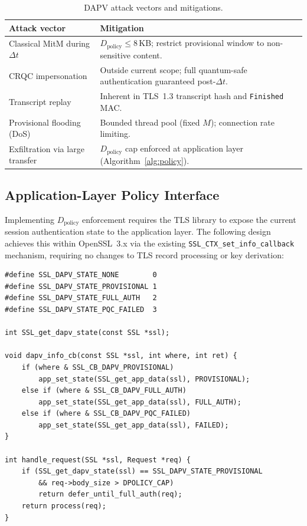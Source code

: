\documentclass[preprint,10pt,3p]{elsarticle}
\newcommand{\Dt}{\ensuremath{\Delta t}}
\begin{document}
\begin{table}[htbp]
\centering
\caption{DAPV attack vectors and mitigations.}
\label{tab:mitigations}
\small
\begin{tabular}{p{3.8cm}p{6.0cm}}
\toprule
\textbf{Attack vector} & \textbf{Mitigation} \\
\midrule
Classical MitM during \Dt
  & $D_\text{policy} \leq 8$\,KB; restrict provisional window to
    non-sensitive content. \\[4pt]
CRQC impersonation
  & Outside current scope; full quantum-safe authentication guaranteed
    post-\Dt. \\[4pt]
Transcript replay
  & Inherent in TLS~1.3 transcript hash and \texttt{Finished} MAC. \\[4pt]
Provisional flooding (DoS)
  & Bounded thread pool (fixed $M$); connection rate limiting. \\[4pt]
Exfiltration via large transfer
  & $D_\text{policy}$ cap enforced at application layer
    (Algorithm~\ref{alg:policy}). \\
\bottomrule
\end{tabular}
\end{table}

\subsection{Application-Layer Policy Interface}

Implementing $D_\text{policy}$ enforcement requires the TLS library to expose
the current session authentication state to the application layer.  The
following design achieves this within OpenSSL~3.x via the existing
\texttt{SSL\_CTX\_set\_info\_callback} mechanism, requiring no changes to TLS
record processing or key derivation:

\begin{verbatim}
#define SSL_DAPV_STATE_NONE        0
#define SSL_DAPV_STATE_PROVISIONAL 1
#define SSL_DAPV_STATE_FULL_AUTH   2
#define SSL_DAPV_STATE_PQC_FAILED  3

int SSL_get_dapv_state(const SSL *ssl);

void dapv_info_cb(const SSL *ssl, int where, int ret) {
    if (where & SSL_CB_DAPV_PROVISIONAL)
        app_set_state(SSL_get_app_data(ssl), PROVISIONAL);
    else if (where & SSL_CB_DAPV_FULL_AUTH)
        app_set_state(SSL_get_app_data(ssl), FULL_AUTH);
    else if (where & SSL_CB_DAPV_PQC_FAILED)
        app_set_state(SSL_get_app_data(ssl), FAILED);
}

int handle_request(SSL *ssl, Request *req) {
    if (SSL_get_dapv_state(ssl) == SSL_DAPV_STATE_PROVISIONAL
        && req->body_size > DPOLICY_CAP)
        return defer_until_full_auth(req);
    return process(req);
}
\end{verbatim}
\end{document}
